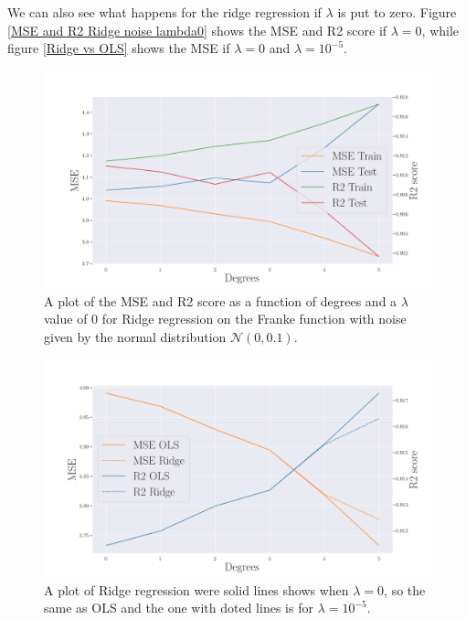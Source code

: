 \noindent We can also see what happens for the ridge regression if $\lambda$ is put to zero. Figure \eqref{MSE and R2 Ridge noise lambda0} shows the MSE and R2 score if $\lambda = 0$, while figure \eqref{Ridge vs OLS} shows the MSE if $\lambda = 0$ and $\lambda = 10^{-5}$. 
\begin{figure}[H]
	\centering
	\includegraphics[width=\linewidth]{images/Figure_17.png}
	\caption{A plot of the MSE and R2 score as a function of degrees and a $\lambda$ value of $0$ for Ridge regression on the Franke function with noise given by the normal distribution $\mathcal{N}(0,0.1)$.}
	\label{MSE and R2 Ridge noise lambda0}
\end{figure}
\begin{figure}[H]
	\centering
	\includegraphics[width=\linewidth]{images/Figure_19.png}
	\caption{A plot of Ridge regression were solid lines shows when $\lambda = 0$, so the same as OLS and the one with doted lines is for $\lambda = 10^{-5}$.}
	\label{Ridge vs OLS}
\end{figure}


